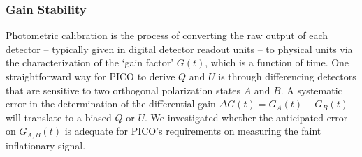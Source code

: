 \documentclass[PICOReport.tex]{subfiles}
\begin{document}

\subsubsection{Gain Stability}
\label{sec:gain_stability}

Photometric calibration is the process of converting the raw output of each detector -- typically given in digital detector readout units -- to physical units via the characterization of the `gain factor' $G(t)$, which is a function of time. One straightforward way for PICO to derive $Q$ and $U$ is through differencing detectors that are sensitive to two orthogonal polarization states $A$ and $B$. A systematic error in the determination of the differential gain $\Delta G(t) = G_{A}(t) - G_{B}(t)$ will translate to a biased $Q$ or $U$. We investigated whether the anticipated error on $G_{A,B} (t)$ is adequate for PICO's requirements on measuring the faint inflationary signal.  
\end{document}
